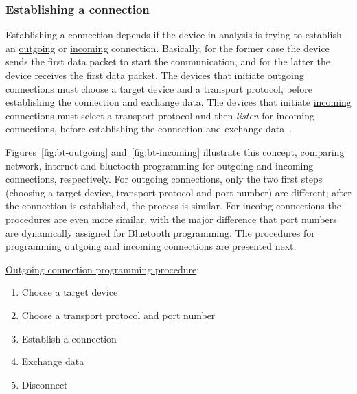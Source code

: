 \subsubsection{Establishing a connection}%
\label{sec:bt-establish-conn}
Establishing a connection depends if the device in analysis is trying to
establish an \uline{outgoing} or \uline{incoming} connection. Basically, for the
former case the device sends the first data packet to start the communication,
and for the latter the device receives the first data packet. The devices that
initiate \uline{outgoing} connections must choose a target device and a
transport protocol, before establishing the connection and exchange data. The
devices that initiate \uline{incoming} connections must select a transport
protocol and then \textit{listen} for incoming connections, before establishing
the connection and exchange data~\cite{huang2007bluetooth}.

Figures~\ref{fig:bt-outgoing} and~\ref{fig:bt-incoming} illustrate this concept,
comparing network, internet and bluetooth programming for outgoing and incoming
connections, respectively. For outgoing connections, only the two first steps
(choosing a target device, transport protocol and port number) are different;
after the connection is established, the process is similar. For incoing
connections the procedures are even more similar, with the major difference that
port numbers are dynamically assigned for Bluetooth programming. The procedures
for programming outgoing and incoming connections are presented next.

\uline{Outgoing connection programming procedure}:
\begin{enumerate}
\item Choose a target device
\item Choose a transport protocol and port number
\item Establish a connection
\item Exchange data
\item Disconnect
\end{enumerate}

